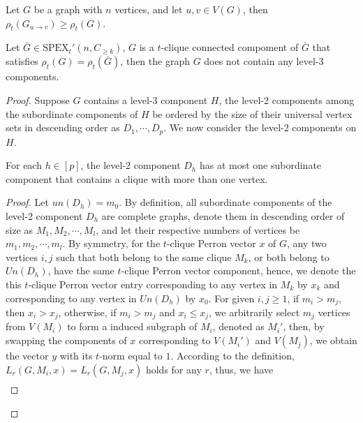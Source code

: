 \documentclass[10pt,a4paper]{amsart}
\begin{document}
        \begin{lem}\label{CL1}
                Let $G$ be a graph with $n$ vertices, and let $u,v \in V(G)$, then $\rho_t(G_{u \to v}) \geq \rho_t(G)$.
        \end{lem}

        \begin{lem}\label{CL4}
                 Let $\bar{G} \in \mathrm{SPEX}_t'(n, C_{\geq k})$, $G $ is a $t$-clique connected compoment of $\bar{G} $ that satisfies $\rho_t(G) = \rho_t(\bar{G})$, then the graph $G$ does not contain any level-3 components.
        \end{lem}

        \begin{proof}

                Suppose $G$ contains a level-3 component $H$, the level-2 components among the subordinate components of $H$ be ordered by the size of their universal vertex sets in descending order as $D_1, \cdots, D_p$. We now consider the level-2 components on $H$.
            \begin{claim}\label{CC1}
                For each $h \in [p]$, the level-2 component $D_h$ has at most one subordinate component that contains a clique with more than one vertex.
            \end{claim}
            \begin{proof}
                Let $un(D_h) = m_0$. By definition, all subordinate components of the level-2 component $D_h$ are complete graphs, denote them in descending order of size as $M_1, M_2, \cdots, M_l$, and let their respective numbers of vertices be $m_1, m_2, \cdots, m_l$.
                By symmetry, for the $t$-clique Perron vector $x$ of $G$, any two vertices $i, j$ such that both belong to the same clique $M_k$, or both belong to $Un(D_h)$, have the same $t$-clique Perron vector component, hence, we denote the this $t$-clique Perron vector entry corresponding to any vertex in $M_k$ by $x_k$ and corresponding to any vertex in $Un(D_h)$ by $x_0$.
                For given $i, j \geq 1$, if $m_i > m_j$, then $x_i > x_j$, otherwise, if $m_i > m_j$ and $x_i \leq x_j$, we arbitrarily select $m_j$ vertices from $V(M_i)$ to form a induced subgraph of $M_i$, denoted as $M_i'$, then, by swapping the components of $x$ corresponding to $V(M_i')$ and $V(M_j)$, we obtain the vector $y$ with its $t$-norm equal to $1$. According to the definition, $L_r( G , M_i, x)=L_r( G ,M_j, x)$ holds for any $r$, thus, we have
                    \begin{align*}

\end{align*}
\end{proof}
\end{proof}
\end{document}
